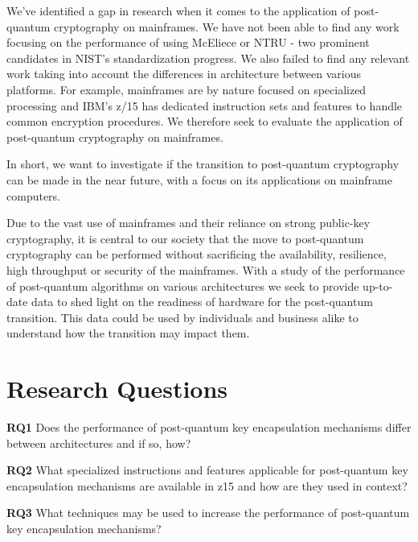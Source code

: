 We've identified a gap in research when it comes to the application of post-quantum cryptography on mainframes. We have not been able to find any work focusing on the performance of using McEliece or NTRU - two prominent candidates in NIST's standardization progress. We also failed to find any relevant work taking into account the differences in architecture between various platforms. For example, mainframes are by nature focused on specialized processing and IBM's z/15 has dedicated instruction sets and features to handle common encryption procedures\cite{ibm2020:quantum-computer}. We therefore seek to evaluate the application of post-quantum cryptography on mainframes.

In short, we want to investigate if the transition to post-quantum cryptography can be made in the near future, with a focus on its applications on mainframe computers.

Due to the vast use of mainframes and their reliance on strong public-key cryptography, it is central to our society that the move to post-quantum cryptography can be performed without sacrificing the availability, resilience, high throughput or security of the mainframes. With a study of the performance of post-quantum algorithms on various architectures we seek to provide up-to-date data to shed light on the readiness of hardware for the post-quantum transition. This data could be used by individuals and business alike to understand how the transition may impact them.


\section{Research Questions}
\label{section:introduction:research-questions}

\noindent\textbf{RQ1} Does the performance of \gls{post-quantum} key encapsulation mechanisms differ between architectures and if so, how?\label{rq1}\hfill\par
\noindent\textbf{RQ2} What specialized instructions and features applicable for \gls{post-quantum} key encapsulation mechanisms are available in \gls{z15} and how are they used in context?\label{rq2}\hfill\par
\noindent\textbf{RQ3} What techniques may be used to increase the performance of \gls{post-quantum} key encapsulation mechanisms?\label{rq3}\hfill\par

